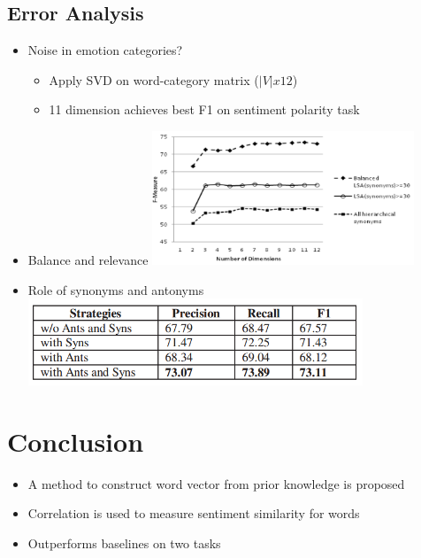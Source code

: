 \documentclass[compress]{beamer}
\begin{document}
\subsection{Error Analysis}
\begin{frame}[allowframebreaks]{\subsecname}


\begin{itemize}
\item Noise in emotion categories?
\begin{itemize}
\item Apply SVD on word-category matrix ($|V|x12$)
\item 11 dimension achieves best F1 on sentiment polarity task
\end{itemize}
\item Balance and relevance
\includegraphics[height=4cm]{error.png}
\end{itemize}
\framebreak

\begin{itemize}
\item Role of synonyms and antonyms
\includegraphics[width=10cm]{error2.png}
\end{itemize}
\end{frame}

\section{Conclusion}
\begin{frame}{\secname}
\begin{itemize}
\item A method to construct word vector from prior knowledge is proposed
\item Correlation is used to measure sentiment similarity for words
\item Outperforms baselines on two tasks
\end{itemize}
\end{frame}
\end{document}

